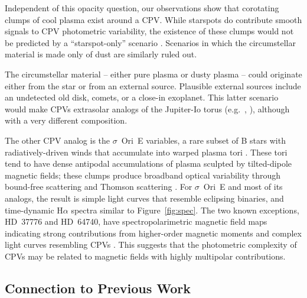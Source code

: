 \documentclass[11pt,twocolumn,tighten,linenumbers]{aastex7}
\begin{document}
Independent of this opacity question, our observations show that
corotating clumps of cool plasma exist around a CPV.  While starspots
do contribute smooth signals to CPV photometric variability, the
existence of these clumps  would not be predicted by a
``starspot-only'' scenario \citep{Koen2021}.  Scenarios in which the
circumstellar material is made only of dust are similarly ruled out.  

The circumstellar material -- either pure plasma or dusty plasma --
could originate either from the star or from an external source.
Plausible external sources include an undetected old disk, comets, or
a close-in exoplanet.  This latter scenario would make CPVs extrasolar
analogs of the Jupiter-Io torus (e.g.~\citealt{Bagenal1981},
\citealt{Kislyakova2018}), although with a very different composition.

The other CPV analog is the $\sigma$~Ori~E variables, a rare subset of
B stars with radiatively-driven winds that accumulate into warped
plasma tori \citep{Townsend2005}.  These tori tend to have dense
antipodal accumulations of plasma sculpted by tilted-dipole magnetic
fields; these clumps produce broadband optical variability through
bound-free scattering \citep{Townsend2005} and Thomson scattering
\citep{Berry2022}.  For $\sigma$~Ori~E and most of its analogs, the
result is simple light curves that resemble eclipsing binaries, and
time-dynamic H$\alpha$ spectra similar to Figure~\ref{fig:spec}.  The
two known exceptions, HD~37776 and HD~64740, have spectropolarimetric
magnetic field maps indicating strong contributions from higher-order
magnetic moments \citep{Kochukhov2011,Shultz2018} and complex light
curves resembling CPVs \citep{Mikulasek2020,Bouma2024}.  This suggests
that the photometric complexity of CPVs may be related to magnetic
fields with highly multipolar contributions.  


\subsection{Connection to Previous Work}
\end{document}
